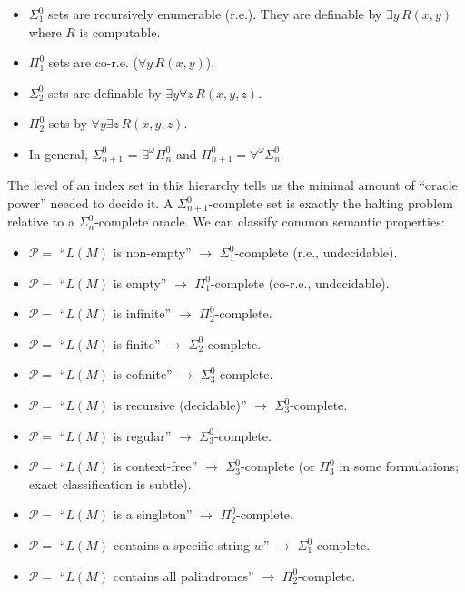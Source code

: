 \begin{itemize}
\item $\Sigma^0_1$ sets are recursively enumerable (r.e.). They are definable by $\exists y \, R(x, y)$ where $R$ is computable.
\item $\Pi^0_1$ sets are co-r.e. ($\forall y \, R(x, y)$).
\item $\Sigma^0_2$ sets are definable by $\exists y \forall z \, R(x, y, z)$.
\item $\Pi^0_2$ sets by $\forall y \exists z \, R(x, y, z)$.
\item In general, $\Sigma^0_{n+1}$ = $\exists^\omega \Pi^0_n$ and $\Pi^0_{n+1} = \forall^\omega \Sigma^0_n$.
\end{itemize}

The level of an index set in this hierarchy tells us the minimal amount of ``oracle power'' needed to decide it. A $\Sigma^0_{n+1}$-complete set is exactly the halting problem relative to a $\Sigma^0_n$-complete oracle. We can classify common semantic properties:

\begin{itemize}
\item $\mathcal{P} =$ ``$L(M)$ is non-empty'' $\to$ $\Sigma^0_1$-complete (r.e., undecidable).
\item $\mathcal{P} =$ ``$L(M)$ is empty'' $\to$ $\Pi^0_1$-complete (co-r.e., undecidable).
\item $\mathcal{P} =$ ``$L(M)$ is infinite'' $\to$ $\Pi^0_2$-complete.
\item $\mathcal{P} =$ ``$L(M)$ is finite'' $\to$ $\Sigma^0_2$-complete.
\item $\mathcal{P} =$ ``$L(M)$ is cofinite'' $\to$ $\Sigma^0_3$-complete.
\item $\mathcal{P} =$ ``$L(M)$ is recursive (decidable)'' $\to$ $\Sigma^0_3$-complete.
\item $\mathcal{P} =$ ``$L(M)$ is regular'' $\to$ $\Sigma^0_3$-complete.
\item $\mathcal{P} =$ ``$L(M)$ is context-free'' $\to$ $\Sigma^0_3$-complete (or $\Pi^0_3$ in some formulations; exact classification is subtle).
\item $\mathcal{P} =$ ``$L(M)$ is a singleton'' $\to$ $\Pi^0_2$-complete.
\item $\mathcal{P} =$ ``$L(M)$ contains a specific string $w$'' $\to$ $\Sigma^0_1$-complete.
\item $\mathcal{P} =$ ``$L(M)$ contains all palindromes'' $\to$ $\Pi^0_2$-complete.
\end{itemize}

